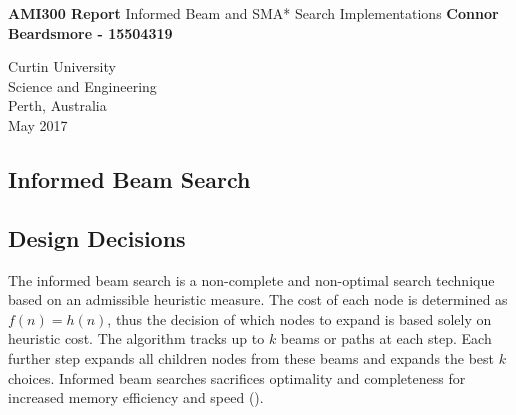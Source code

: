 \documentclass[]{article}
\begin{document}


	

\begin{titlepage}
	\begin{center}
		\vspace*{1cm}
		\LARGE\textbf{AMI300 Report} \vspace{0.5cm}
		\break
	    Informed Beam and SMA* Search Implementations
		\vspace{1cm}
		\break
		\Large\textbf{Connor Beardsmore - 15504319} 
		\vspace{15cm}

		\normalsize
		Curtin University \\
		Science and Engineering \\
		Perth, Australia \\
	    May 2017
	    
	\end{center}
\end{titlepage}


\vspace*{-0.8cm}
\begin{center}
	\section*{Informed Beam Search}
\end{center}

\vspace*{0.8cm}
\subsection*{Design Decisions}

The informed beam search is a non-complete and non-optimal search technique based on an admissible heuristic measure. The cost of each node is determined as $f(n)=h(n)$, thus the decision of which nodes to expand is based solely on heuristic cost. The algorithm tracks up to $k$ beams or paths at each step. Each further step expands all children nodes from these beams and expands the best $k$ choices. Informed beam searches sacrifices optimality and completeness for increased memory efficiency and speed (\cite{winston}).\\
\end{document}
